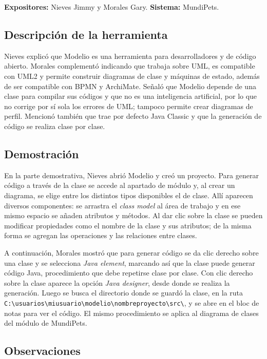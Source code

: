 \documentclass[journal,onecolumn]{IEEEtran}
\begin{document}
	\textbf{Expositores:} Nieves Jimmy y Morales Gary. \quad \textbf{Sistema:} MundiPets.
	
	\subsection{Descripción de la herramienta}
	
	Nieves explicó que Modelio es una herramienta para desarrolladores y de código abierto. Morales complementó indicando que trabaja sobre UML, es compatible con UML2 y permite construir diagramas de clase y máquinas de estado, además de ser compatible con BPMN y ArchiMate. Señaló que Modelio depende de una clase para compilar sus códigos y que no es una inteligencia artificial, por lo que no corrige por sí sola los errores de UML; tampoco permite crear diagramas de perfil. Mencionó también que trae por defecto Java Classic y que la generación de código se realiza clase por clase.
	
	\subsection{Demostración}
	
	En la parte demostrativa, Nieves abrió Modelio y creó un proyecto. Para generar código a través de la clase se accede al apartado de módulo y, al crear un diagrama, se elige entre los distintos tipos disponibles el de clase. Allí aparecen diversos componentes: se arrastra el \textit{class model} al área de trabajo y en ese mismo espacio se añaden atributos y métodos. Al dar clic sobre la clase se pueden modificar propiedades como el nombre de la clase y sus atributos; de la misma forma se agregan las operaciones y las relaciones entre clases.
	
	A continuación, Morales mostró que para generar código se da clic derecho sobre una clase y se selecciona \textit{Java element}, marcando así que la clase puede generar código Java, procedimiento que debe repetirse clase por clase. Con clic derecho sobre la clase aparece la opción \textit{Java designer}, desde donde se realiza la generación. Luego se busca el directorio donde se guardó la clase, en la ruta \\ \texttt{C:\textbackslash usuarios\textbackslash miusuario\textbackslash modelio\textbackslash nombreproyecto\textbackslash src\textbackslash}, y se abre en el bloc de notas para ver el código. El mismo procedimiento se aplica al diagrama de clases del módulo de MundiPets.
	
	\subsection{Observaciones}
	
\end{document}
